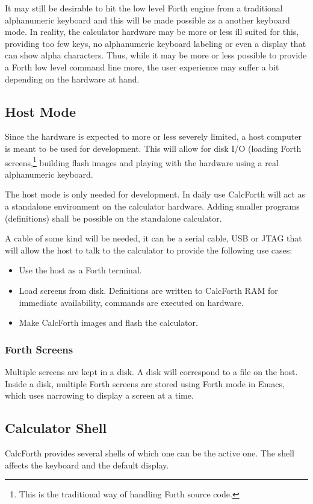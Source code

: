 \documentclass[a4paper]{article}
\begin{document}
It may still be desirable to hit the low level Forth engine from a traditional alphanumeric keyboard and this will be made possible as a another keyboard mode. In reality, the calculator hardware may be more or less ill suited for this, providing too few keys, no alphanumeric keyboard labeling or even a display that can show alpha characters. Thus, while it may be more or less possible to provide a Forth low level command line more, the user experience may suffer a bit depending on the hardware at hand.

\subsection{Host Mode}
Since the hardware is expected to more or less severely limited, a host computer is meant to be used for development. This will allow for disk I/O (loading Forth screens,\footnote{This is the traditional way of handling Forth source code.} building flash images and playing with the hardware using a real alphanumeric keyboard.

The host mode is only needed for development. In daily use CalcForth will act as a standalone environment on the calculator hardware. Adding smaller programs (definitions) shall be possible on the standalone calculator.

A cable of some kind will be needed, it can be a serial cable, USB or JTAG that will allow the host to talk to the calculator to provide the following use cases:
\begin{itemize}
\item Use the host as a Forth terminal.
\item Load screens from disk. Definitions are written to CalcForth RAM for immediate availability, commands are executed on hardware.
\item Make CalcForth images and flash the calculator.
\end{itemize}

\subsubsection{Forth Screens}
Multiple screens are kept in a disk. A disk will correspond to a file on the host. Inside a disk, multiple Forth screens are stored using Forth mode in Emacs, which uses narrowing to display a screen at a time.


\subsection{Calculator Shell}
CalcForth provides several shells of which one can be the active one. The shell affects the keyboard and the default display.
\end{document}
